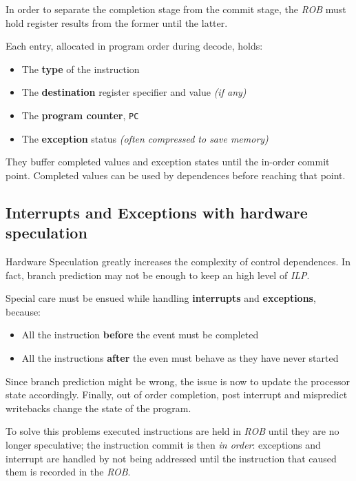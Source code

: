 \documentclass[english]{article}
\begin{document}
\bigskip
In order to separate the completion stage from the commit stage, the \textit{ROB} must hold register results from the former until the latter.

Each entry, allocated in program order during decode, holds:

\begin{itemize}
  \item The \textbf{type} of the instruction
  \item The \textbf{destination} register specifier and value \textit{(if any)}
  \item The \textbf{program counter}, \texttt{PC}
  \item The \textbf{exception} status \textit{(often compressed to save memory)}
\end{itemize}

They buffer completed values and exception states until the in-order commit point.
Completed values can be used by dependences before reaching that point.

\subsection{Interrupts and Exceptions with hardware speculation}

Hardware Speculation greatly increases the complexity of control dependences.
In fact, branch prediction may not be enough to keep an high level of \textit{ILP}.

Special care must be ensued while handling \textbf{interrupts} and \textbf{exceptions}, because:

\begin{itemize}
  \item All the instruction \textbf{before} the event must be completed
  \item All the instructions \textbf{after} the even must behave as they have never started
\end{itemize}

Since branch prediction might be wrong, the issue is now to update the processor state accordingly.
Finally, out of order completion, post interrupt and mispredict writebacks change the state of the program.

To solve this problems executed instructions are held in \textit{ROB} until they are no longer speculative;
the instruction commit is then \textit{in order}: exceptions and interrupt are handled by not being addressed until the instruction that caused them is recorded in the \textit{ROB}.
\end{document}

